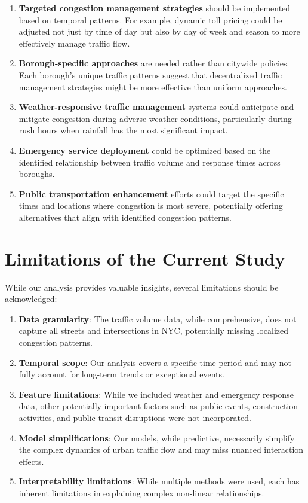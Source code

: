 \documentclass[
  letterpaper,
  DIV=11,
  numbers=noendperiod]{scrreprt}
\begin{document}
\begin{enumerate}
\def\labelenumi{\arabic{enumi}.}
\item
  \textbf{Targeted congestion management strategies} should be
  implemented based on temporal patterns. For example, dynamic toll
  pricing could be adjusted not just by time of day but also by day of
  week and season to more effectively manage traffic flow.
\item
  \textbf{Borough-specific approaches} are needed rather than citywide
  policies. Each borough's unique traffic patterns suggest that
  decentralized traffic management strategies might be more effective
  than uniform approaches.
\item
  \textbf{Weather-responsive traffic management} systems could
  anticipate and mitigate congestion during adverse weather conditions,
  particularly during rush hours when rainfall has the most significant
  impact.
\item
  \textbf{Emergency service deployment} could be optimized based on the
  identified relationship between traffic volume and response times
  across boroughs.
\item
  \textbf{Public transportation enhancement} efforts could target the
  specific times and locations where congestion is most severe,
  potentially offering alternatives that align with identified
  congestion patterns.
\end{enumerate}

\section{Limitations of the Current
Study}\label{limitations-of-the-current-study}

While our analysis provides valuable insights, several limitations
should be acknowledged:

\begin{enumerate}
\def\labelenumi{\arabic{enumi}.}
\item
  \textbf{Data granularity}: The traffic volume data, while
  comprehensive, does not capture all streets and intersections in NYC,
  potentially missing localized congestion patterns.
\item
  \textbf{Temporal scope}: Our analysis covers a specific time period
  and may not fully account for long-term trends or exceptional events.
\item
  \textbf{Feature limitations}: While we included weather and emergency
  response data, other potentially important factors such as public
  events, construction activities, and public transit disruptions were
  not incorporated.
\item
  \textbf{Model simplifications}: Our models, while predictive,
  necessarily simplify the complex dynamics of urban traffic flow and
  may miss nuanced interaction effects.
\item
  \textbf{Interpretability limitations}: While multiple methods were
  used, each has inherent limitations in explaining complex non-linear
  relationships.
\end{enumerate}
\end{document}
